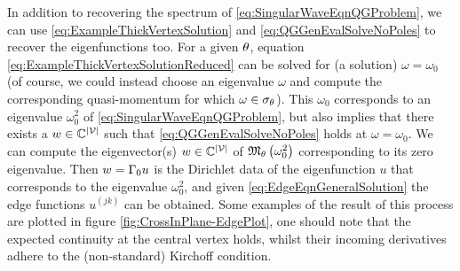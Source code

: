 In addition to recovering the spectrum of \eqref{eq:SingularWaveEqnQGProblem}, we can use \eqref{eq:ExampleThickVertexSolution} and \eqref{eq:QGGenEvalSolveNoPoles} to recover the eigenfunctions too.
For a given $\theta$, equation \eqref{eq:ExampleThickVertexSolutionReduced} can be solved for (a solution) $\omega=\omega_0$ (of course, we could instead choose an eigenvalue $\omega$ and compute the corresponding quasi-momentum for which $\omega\in\sigma_{\theta}$).
This $\omega_0$ corresponds to an eigenvalue $\omega_0^2$ of \eqref{eq:SingularWaveEqnQGProblem}, but also implies that there exists a $w\in\mathbb{C}^{\left\lvert \mathcal{V} \right\rvert}$ such that \eqref{eq:QGGenEvalSolveNoPoles} holds at $\omega=\omega_0$.
We can compute the eigenvector(s) $w\in\mathbb{C}^{\left\lvert \mathcal{V} \right\rvert}$ of $\mathfrak{M}_{\theta}\left( \omega_0^2 \right)$ corresponding to its zero eigenvalue.
Then $w = \Gamma_0 u$ is the Dirichlet data of the eigenfunction $u$ that corresponds to the eigenvalue $\omega_0^2$, and given \eqref{eq:EdgeEqnGeneralSolution} the edge functions $u^{(jk)}$ can be obtained.
Some examples of the result of this process are plotted in figure \ref{fig:CrossInPlane-EdgePlot}, one should note that the expected continuity at the central vertex holds, whilst their incoming derivatives adhere to the (non-standard) Kirchoff condition. 
